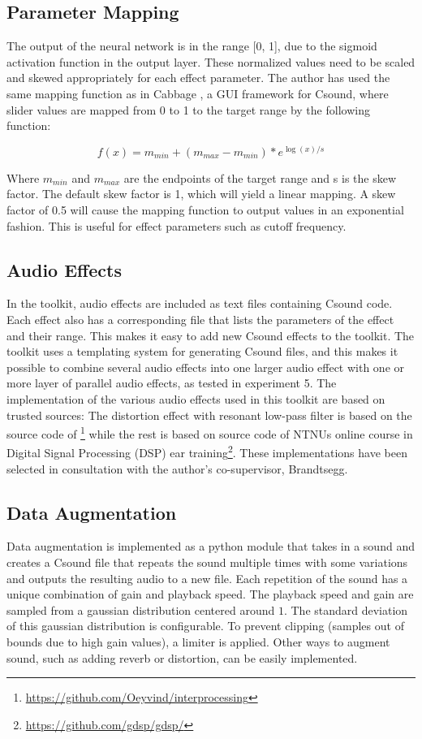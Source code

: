 \subsection{Parameter Mapping}
The output of the neural network is in the range [0, 1], due to the sigmoid activation function in the output layer. These normalized values need to be scaled and skewed appropriately for each effect parameter. The author has used the same mapping function as in Cabbage \citep{walsh2008}, a GUI framework for Csound, where slider values are mapped from 0 to 1 to the target range by the following function:

$$f(x)=m_{min}+(m_{max}-m_{min})*e^{\log(x)/s}$$

Where $m_{min}$ and $m_{max}$ are the endpoints of the target range and s is the skew factor. The default skew factor is 1, which will yield a linear mapping. A skew factor of 0.5 will cause the mapping function to output values in an exponential fashion. This is useful for effect parameters such as cutoff frequency.

\subsection{Audio Effects}
In the toolkit, audio effects are included as text files containing Csound code. Each effect also has a corresponding file that lists the parameters of the effect and their range. This makes it easy to add new Csound effects to the toolkit. The toolkit uses a templating system for generating Csound files, and this makes it possible to combine several audio effects into one larger audio effect with one or more layer of parallel audio effects, as tested in experiment 5. The implementation of the various audio effects used in this toolkit are based on trusted sources: The distortion effect with resonant low-pass filter is based on the source code of \cite{brandtsegg2015}\footnote{\url{https://github.com/Oeyvind/interprocessing}} while the rest is based on source code of NTNUs online course in Digital Signal Processing (DSP) ear training\footnote{\url{https://github.com/gdsp/gdsp/}}. These implementations have been selected in consultation with the author's co-supervisor, Brandtsegg.

\subsection{Data Augmentation}
Data augmentation is implemented as a python module that takes in a sound and creates a Csound file that repeats the sound multiple times with some variations and outputs the resulting audio to a new file. Each repetition of the sound has a unique combination of gain and playback speed. The playback speed and gain are sampled from a gaussian distribution centered around $1$. The standard deviation of this gaussian distribution is configurable. To prevent clipping (samples out of bounds due to high gain values), a limiter is applied. Other ways to augment sound, such as adding reverb or distortion, can be easily implemented.

